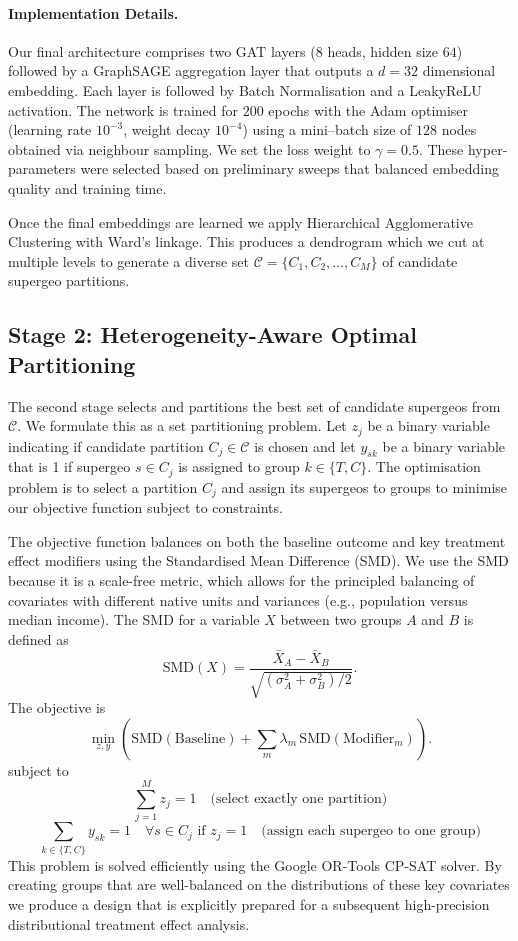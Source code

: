 \documentclass[final,3p,fleqn, 10pt]{elsarticle}
\begin{document}
    \paragraph{Implementation Details.} Our final architecture comprises two GAT layers (8 heads, hidden size $64$) followed by a GraphSAGE aggregation layer that outputs a $d=32$ dimensional embedding. Each layer is followed by Batch Normalisation and a LeakyReLU activation. The network is trained for $200$ epochs with the Adam optimiser (learning rate $10^{-3}$, weight decay $10^{-4}$) using a mini--batch size of $128$ nodes obtained via neighbour sampling. We set the loss weight to $\gamma = 0.5$. These hyper-parameters were selected based on preliminary sweeps that balanced embedding quality and training time.

    Once the final embeddings are learned we apply Hierarchical Agglomerative Clustering with Ward's linkage. This produces a dendrogram which we cut at multiple levels to generate a diverse set $\mathcal{C} = \{C_1, C_2, \dots, C_M\}$ of candidate supergeo partitions.

    \subsection{Stage 2: Heterogeneity-Aware Optimal Partitioning}
    The second stage selects and partitions the best set of candidate supergeos from $\mathcal{C}$. We formulate this as a set partitioning problem. Let $z_j$ be a binary variable indicating if candidate partition $C_j \in \mathcal{C}$ is chosen and let $y_{sk}$ be a binary variable that is 1 if supergeo $s \in C_j$ is assigned to group $k \in \{T, C\}$. The optimisation problem is to select a partition $C_j$ and assign its supergeos to groups to minimise our objective function subject to constraints.

    The objective function balances on both the baseline outcome and key treatment effect modifiers using the Standardised Mean Difference (SMD). We use the SMD because it is a scale-free metric, which allows for the principled balancing of covariates with different native units and variances (e.g., population versus median income). The SMD for a variable $X$ between two groups $A$ and $B$ is defined as \[
    \text{SMD}(X) = \frac{\bar{X}_A - \bar{X}_B}{\sqrt{(\sigma_A^{2} + \sigma_B^{2})/2}}.
\] The objective is
    \[
\min_{z, y} \left( \text{SMD}(\text{Baseline}) + \sum_{m} \lambda_m\, \text{SMD}(\text{Modifier}_m) \right).
\]
    subject to
    $$ \sum_{j=1}^{M} z_j = 1 \quad \text{(select exactly one partition)} $$
    $$ \sum_{k \in \{T,C\}} y_{sk} = 1 \quad \forall s \in C_j \text{ if } z_j=1 \quad \text{(assign each supergeo to one group)} $$
    This problem is solved efficiently using the Google OR-Tools CP-SAT solver. By creating groups that are well-balanced on the distributions of these key covariates we produce a design that is explicitly prepared for a subsequent high-precision distributional treatment effect analysis.
\end{document}

